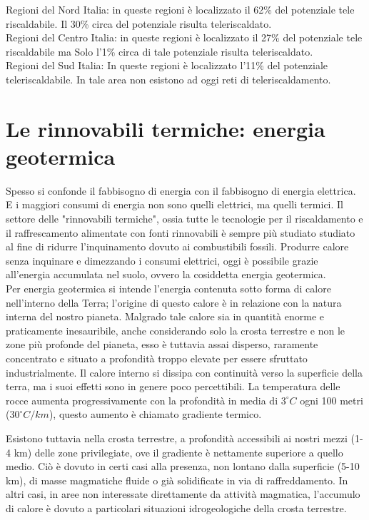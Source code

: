 \documentclass[laurea,oneside,11pt]{USiena_tesiLM}
\begin{document}
Regioni del Nord Italia: in queste regioni è localizzato il 62\% del potenziale tele riscaldabile. Il 30\% circa del potenziale risulta teleriscaldato. \\

Regioni del Centro Italia: in queste regioni è localizzato il 27\% del potenziale tele riscaldabile ma Solo l'1\% circa di tale potenziale risulta teleriscaldato. \\

Regioni del Sud Italia: In queste regioni è localizzato l'11\% del potenziale teleriscaldabile. In tale area non esistono ad oggi reti di teleriscaldamento.

\section{Le rinnovabili termiche: energia geotermica}
Spesso si confonde il fabbisogno di energia con il fabbisogno di energia elettrica. E i maggiori consumi di energia non sono quelli elettrici, ma quelli termici. Il settore delle "rinnovabili termiche", ossia tutte le tecnologie per il riscaldamento e il raffrescamento alimentate con fonti rinnovabili è sempre più studiato studiato al fine di ridurre l'inquinamento dovuto ai combustibili fossili.
Produrre calore senza inquinare e dimezzando i consumi elettrici, oggi è possibile grazie all'energia accumulata nel suolo, ovvero la cosiddetta energia geotermica.\\

Per energia geotermica si intende l'energia contenuta sotto forma  di calore nell'interno della Terra; l'origine di questo calore è in relazione con la natura interna del nostro pianeta. Malgrado tale calore sia in quantità enorme e praticamente inesauribile, anche considerando solo la crosta terrestre e non le zone più profonde del pianeta, esso è tuttavia assai disperso, raramente concentrato e situato a profondità troppo elevate per essere sfruttato industrialmente. Il calore interno si dissipa con continuità verso la superficie della terra, ma i suoi effetti sono in genere poco percettibili. La temperatura delle rocce aumenta progressivamente con la profondità in media di $3 ^{\circ }C$ ogni 100 metri ($30 ^{\circ} C/km$), questo aumento è chiamato gradiente termico.

Esistono tuttavia nella crosta terrestre, a profondità accessibili ai nostri mezzi (1-4 km) delle zone privilegiate, ove il gradiente è nettamente superiore a quello medio. Ciò è dovuto in certi casi alla presenza, non lontano dalla superficie (5-10 km), di masse magmatiche fluide o già solidificate in via di raffreddamento. In altri casi, in aree non interessate direttamente da attività magmatica, l'accumulo di calore è dovuto a particolari situazioni idrogeologiche della crosta terrestre.
\end{document}
